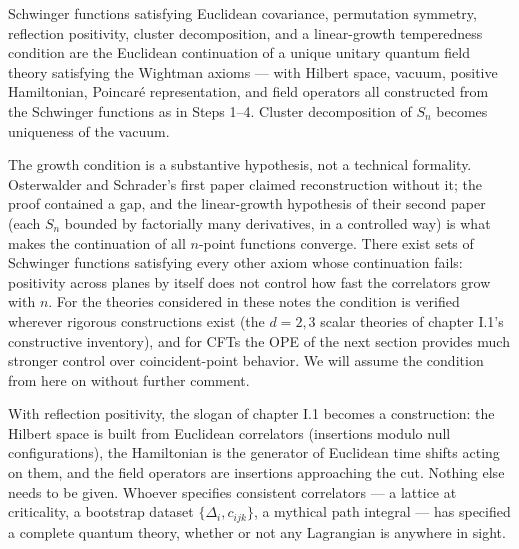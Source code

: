\begin{ttheorem}
\label{thm:os}
Schwinger functions satisfying Euclidean covariance, permutation symmetry,
reflection positivity, cluster decomposition, and a linear-growth temperedness
condition are the Euclidean continuation of a unique unitary quantum field
theory satisfying the Wightman axioms --- with Hilbert space, vacuum, positive
Hamiltonian, Poincar\'e representation, and field operators all constructed
from the Schwinger functions as in Steps 1--4. Cluster decomposition of $S_n$
becomes uniqueness of the vacuum.
\end{ttheorem}

\begin{nnote}
The growth condition is a substantive hypothesis, not a technical formality.
Osterwalder and Schrader's first paper claimed reconstruction without it; the
proof contained a gap, and the linear-growth hypothesis of their second paper
(each $S_n$ bounded by factorially many derivatives, in a controlled way) is
what makes the continuation of all $n$-point functions converge. There exist
sets of Schwinger functions satisfying every other axiom whose continuation
fails: positivity across planes by itself does not control how fast the
correlators grow with $n$. For the theories considered in these notes the
condition is verified wherever rigorous constructions exist (the $d = 2, 3$
scalar theories of chapter I.1's constructive inventory), and for CFTs the
OPE of the next section provides much stronger control over coincident-point
behavior. We will assume the condition from here on without further comment.
\end{nnote}

\begin{iidea}
\label{idea:correlators-are-theory}
With reflection positivity, the slogan of chapter I.1 becomes a construction:
the Hilbert space is built from Euclidean correlators (insertions modulo null
configurations), the Hamiltonian is the generator of Euclidean time shifts
acting on them, and the field operators are insertions approaching the cut.
Nothing else needs to be given. Whoever specifies consistent correlators ---
a lattice at criticality, a bootstrap dataset $\{\Delta_i, c_{ijk}\}$, a
mythical path integral --- has specified a complete quantum theory, whether or
not any Lagrangian is anywhere in sight.
\end{iidea}

